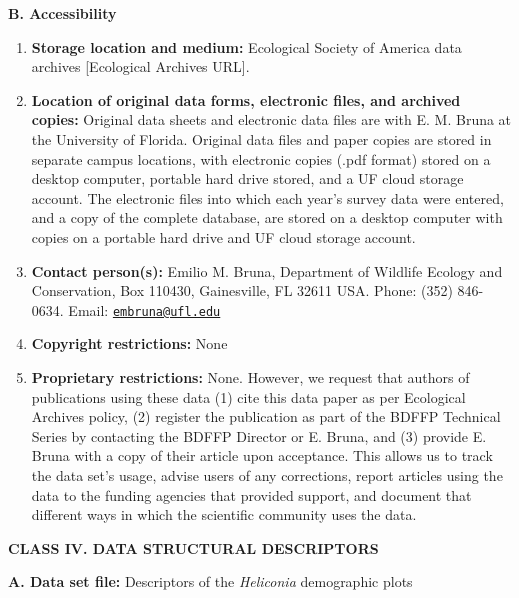 \documentclass[
  english,
  man]{apa6}
\begin{document}
\noindent 
\textbf{B. Accessibility}

\begin{enumerate}
\def\labelenumi{\arabic{enumi}.}
\item
  \textbf{Storage location and medium:} Ecological Society of America data
  archives {[}Ecological Archives URL{]}.
\item
  \textbf{Location of original data forms, electronic files, and archived
  copies:} Original data sheets and electronic data files are with E.
  M. Bruna at the University of Florida. Original data files and paper
  copies are stored in separate campus locations, with electronic
  copies (.pdf format) stored on a desktop computer, portable hard
  drive stored, and a UF cloud storage account. The electronic files
  into which each year's survey data were entered, and a copy of the
  complete database, are stored on a desktop computer with copies on a
  portable hard drive and UF cloud storage account.
\item
  \textbf{Contact person(s):} Emilio M. Bruna, Department of Wildlife
  Ecology and Conservation, Box 110430, Gainesville, FL 32611 USA.
  Phone: (352) 846-0634. Email:
  \href{mailto:embruna@ufl.edu}{\nolinkurl{embruna@ufl.edu}}
\item
  \textbf{Copyright restrictions:} None
\item
  \textbf{Proprietary restrictions:} None. However, we request that authors
  of publications using these data (1) cite this data paper as per
  Ecological Archives policy, (2) register the publication as part of
  the BDFFP Technical Series by contacting the BDFFP Director or E.
  Bruna, and (3) provide E. Bruna with a copy of their article upon
  acceptance. This allows us to track the data set's usage, advise
  users of any corrections, report articles using the data to the
  funding agencies that provided support, and document that different
  ways in which the scientific community uses the data.
\end{enumerate}

\noindent  
\textbf{CLASS IV. DATA STRUCTURAL DESCRIPTORS}

\noindent  
\textbf{A. Data set file:} Descriptors of the \emph{Heliconia} demographic plots
\end{document}
